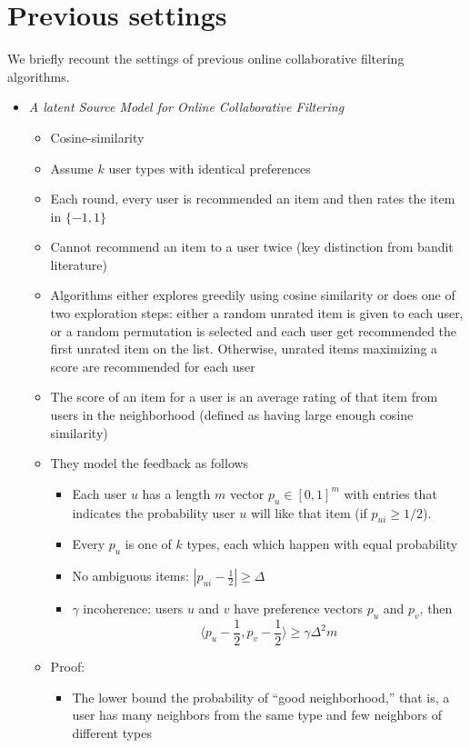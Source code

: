 \documentclass[11pt]{article}
\begin{document}
\section{Previous settings}
We briefly recount the settings of previous online collaborative filtering algorithms.
\begin{itemize}
\item \emph{A latent Source Model for Online Collaborative Filtering}
  \begin{itemize}
  \item Cosine-similarity
  \item Assume $k$ user types with identical preferences
  \item Each round, every user is recommended an item and then rates the item in $\{-1,1\}$
  \item Cannot recommend an item to a user twice (key distinction from bandit literature)
  \item Algorithms either explores greedily using cosine similarity or does one of two exploration steps: either a random unrated item is given to each user, or a random permutation is selected and each user get recommended the first unrated item on the list. Otherwise, unrated items maximizing a score are recommended for each user
  \item The score of an item for a user is an average rating of that item from users in the neighborhood (defined as having large enough cosine similarity)    
  \item They model the feedback as follows
    \begin{itemize}
    \item Each user $u$ has a length $m$ vector $p_u\in[0,1]^m$ with entries that indicates the probability user $u$ will like that item (if $p_{ui}\geq 1/2$).
    \item Every $p_u$ is one of $k$ types, each which happen with equal probability      
    \item No ambiguous items: $|p_{ui}-\frac12|\geq \Delta$ 
    \item $\gamma$ incoherence: users $u$ and $v$ have preference vectors $p_u$ and $p_v$, then
      \[
        \langle p_u - \frac12, p_v - \frac12 \rangle \geq \gamma\Delta^2m
      \]
    \end{itemize}
  \item Proof:
    \begin{itemize}
    \item The lower bound the probability of ``good neighborhood,'' that is, a user has many neighbors from the same type and few neighbors of different types

\end{itemize}
\end{itemize}
\end{itemize}
\end{document}
